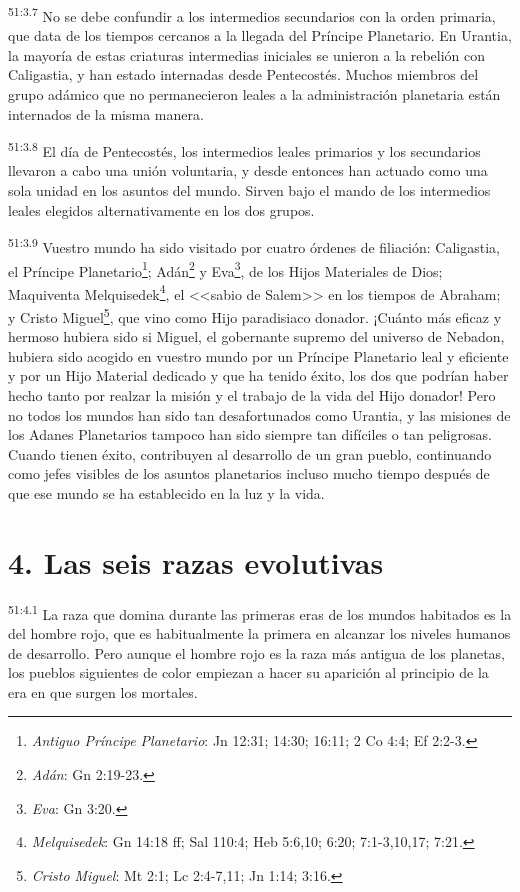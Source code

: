 \par
\textsuperscript{51:3.7} No se debe confundir a los intermedios secundarios con la orden primaria, que data de los tiempos cercanos a la llegada del Príncipe Planetario. En Urantia, la mayoría de estas criaturas intermedias iniciales se unieron a la rebelión con Caligastia, y han estado internadas desde Pentecostés. Muchos miembros del grupo adámico que no permanecieron leales a la administración planetaria están internados de la misma manera.

\par
\textsuperscript{51:3.8} El día de Pentecostés, los intermedios leales primarios y los secundarios llevaron a cabo una unión voluntaria, y desde entonces han actuado como una sola unidad en los asuntos del mundo. Sirven bajo el mando de los intermedios leales elegidos alternativamente en los dos grupos.

\par
\textsuperscript{51:3.9} Vuestro mundo ha sido visitado por cuatro órdenes de filiación: Caligastia, el Príncipe Planetario\footnote{\textit{Antiguo Príncipe Planetario}: Jn 12:31; 14:30; 16:11; 2 Co 4:4; Ef 2:2-3.}; Adán\footnote{\textit{Adán}: Gn 2:19-23.} y Eva\footnote{\textit{Eva}: Gn 3:20.}, de los Hijos Materiales de Dios; Maquiventa Melquisedek\footnote{\textit{Melquisedek}: Gn 14:18 ff; Sal 110:4; Heb 5:6,10; 6:20; 7:1-3,10,17; 7:21.}, el <<sabio de Salem>> en los tiempos de Abraham; y Cristo Miguel\footnote{\textit{Cristo Miguel}: Mt 2:1; Lc 2:4-7,11; Jn 1:14; 3:16.}, que vino como Hijo paradisiaco donador. ¡Cuánto más eficaz y hermoso hubiera sido si Miguel, el gobernante supremo del universo de Nebadon, hubiera sido acogido en vuestro mundo por un Príncipe Planetario leal y eficiente y por un Hijo Material dedicado y que ha tenido éxito, los dos que podrían haber hecho tanto por realzar la misión y el trabajo de la vida del Hijo donador! Pero no todos los mundos han sido tan desafortunados como Urantia, y las misiones de los Adanes Planetarios tampoco han sido siempre tan difíciles o tan peligrosas. Cuando tienen éxito, contribuyen al desarrollo de un gran pueblo, continuando como jefes visibles de los asuntos planetarios incluso mucho tiempo después de que ese mundo se ha establecido en la luz y la vida.

\section*{4. Las seis razas evolutivas}
\par
\textsuperscript{51:4.1} La raza que domina durante las primeras eras de los mundos habitados es la del hombre rojo, que es habitualmente la primera en alcanzar los niveles humanos de desarrollo. Pero aunque el hombre rojo es la raza más antigua de los planetas, los pueblos siguientes de color empiezan a hacer su aparición al principio de la era en que surgen los mortales.

